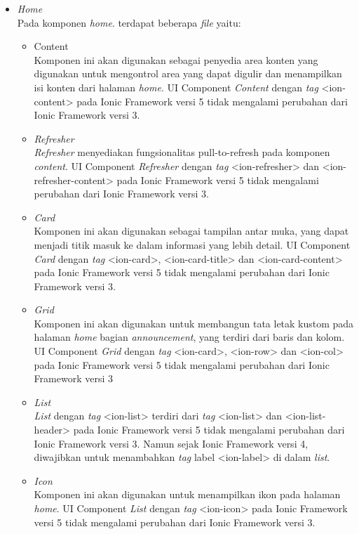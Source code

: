 \begin{itemize}
	\item \textit{Home}\\
	Pada komponen \textit{home}. terdapat beberapa \textit{file} yaitu:
		\begin{itemize}
			\item Content \\
		Komponen ini akan digunakan sebagai penyedia area konten yang digunakan untuk mengontrol area yang dapat digulir dan menampilkan isi konten dari halaman \textit{home}. UI Component \textit{Content} dengan \textit{tag} <ion-content> pada Ionic Framework versi 5 tidak mengalami perubahan dari Ionic Framework versi 3.
		
			\item \textit{Refresher} \\
		\textit{Refresher} menyediakan fungsionalitas  pull-to-refresh pada komponen \textit{content}. UI Component \textit{Refresher} dengan \textit{tag} <ion-refresher> dan <ion-refresher-content> pada Ionic Framework versi 5 tidak mengalami perubahan dari Ionic Framework versi 3.
		
\newpage		
		
			\item \textit{Card} \\
			Komponen ini akan digunakan sebagai tampilan antar muka, yang dapat menjadi titik masuk ke dalam informasi yang lebih detail. UI Component \textit{Card} dengan \textit{tag} <ion-card>, <ion-card-title> dan <ion-card-content> pada Ionic Framework versi 5 tidak mengalami perubahan dari Ionic Framework versi 3.
			
			\item \textit{Grid} \\
			Komponen ini akan digunakan untuk membangun tata letak kustom pada halaman \textit{home} bagian \textit{announcement}, yang terdiri dari baris dan kolom. UI Component \textit{Grid} dengan \textit{tag} <ion-card>, <ion-row> dan <ion-col> pada Ionic Framework versi 5 tidak mengalami perubahan dari Ionic Framework versi 3
			
			\item \textit{List} \\
			\textit{List} dengan \textit{tag} <ion-list> terdiri dari \textit{tag} <ion-list> dan <ion-list-header> pada Ionic Framework versi 5 tidak mengalami perubahan dari Ionic Framework versi 3. Namun sejak Ionic Framework versi 4, diwajibkan untuk menambahkan \textit{tag} label <ion-label> di dalam \textit{list}.
			
			\item \textit{Icon} \\
			Komponen ini akan digunakan untuk menampilkan ikon pada halaman \textit{home}. UI Component \textit{List} dengan \textit{tag} <ion-icon> pada Ionic Framework versi 5 tidak mengalami perubahan dari Ionic Framework versi 3.
			

\end{itemize}
\end{itemize}
